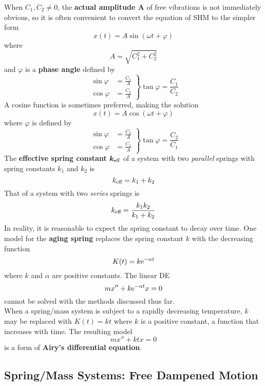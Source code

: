 \documentclass[./Differential Equations.tex]{subfiles}
\begin{document}
				When \(C_1, C_2 \ne 0\), the \textbf{actual amplitude \(\bm{A}\)} of free vibrations is not immediately obvious, so it is often convenient to convert the equation of SHM to the simpler form
					\[x(t) = A\sin(\omega t + \varphi)\]
					where
					\[A = \sqrt{C_1^2 + C_2^2}\]
					and \(\varphi\) is a \textbf{phase angle} defined by
					\[
						\left.\begin{aligned}
							\sin\varphi &= \frac{C_1}{A} \\
							\cos\varphi &= \frac{C_2}{A}
						\end{aligned}\right\}
						\tan\varphi = \frac{C_1}{C_2}
					\]
				A cosine function is sometimes preferred, making the solution
					\[x(t) = A\cos(\omega t + \varphi)\]
					where \(\varphi\) is defined by
					\[
						\left.\begin{aligned}
							\sin\varphi &= \frac{C_2}{A} \\
							\cos\varphi &= \frac{C_1}{A}
						\end{aligned}\right\}
						\tan\varphi = \frac{C_2}{C_1}
					\]
				The \textbf{effective spring constant \(\bm{k_{\text{eff}}}\)} of a system with two \textit{parallel} springs with spring constants \(k_1\) and \(k_2\) is 
					\[k_{\text{eff}} = k_1 + k_2\]
				That of a system with two \textit{series} springs is
					\[k_{\text{eff}} = \frac{k_1k_2}{k_1 + k_2}\]
				In reality, it is reasonable to expect the spring constant to decay over time. One model for the \textbf{aging spring} replaces the spring constant \(k\) with the decreasing function
					\[K(t) = k\text{e}^{-\alpha t}\]
					where \(k\) and \(\alpha\) are positive constants. The linear DE
					\[mx'' + k\text{e}^{-\alpha t}x = 0\]
					cannot be solved with the methods discussed thus far. \\
				When a spring/mass system is subject to a rapidly decreasing temperature, \(k\) may be replaced with \(K(t) = kt\) where \(k\) is a positive constant, a function that increases with time. The resulting model
				\[mx'' + ktx = 0\]
				is a form of \textbf{Airy's differential equation}.
		\subsection{Spring/Mass Systems: Free Dampened Motion}
\end{document}
